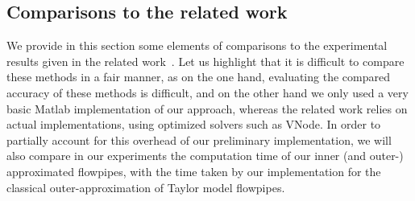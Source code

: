 

\subsection{Comparisons to the related work}
\label{sec:exp_compar}
We provide in this section some elements of comparisons to the experimental results given in the related work~\cite{Underapproxflowpipes,underapprox16}.
Let us highlight that it is difficult to compare these methods in a fair manner, as on the one hand, evaluating the compared accuracy of these methods is difficult, 
and on the other hand we only used a very basic Matlab implementation of our approach, whereas the related work relies on actual implementations,
using optimized solvers such as VNode. In order to partially account for this overhead of our preliminary implementation, we will also compare in our experiments 
the computation time of our inner (and outer-) approximated flowpipes, with the time taken by our implementation for the classical outer-approximation 
of Taylor model flowpipes.  


